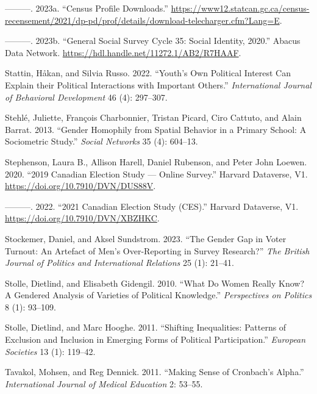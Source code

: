 \documentclass[
  letterpaper,
  DIV=11,
  numbers=noendperiod]{scrreprt}
\newlength{\cslhangindent}
\newenvironment{CSLReferences}[2] %
 {\begin{list}{}{%
  \setlength{\itemindent}{0pt}
  \setlength{\leftmargin}{0pt}
  \setlength{\parsep}{0pt}
  \ifodd #1
   \setlength{\leftmargin}{\cslhangindent}
   \setlength{\itemindent}{-1\cslhangindent}
  \fi
  \setlength{\itemsep}{#2\baselineskip}}}
 {\end{list}}
\begin{document}
\begin{CSLReferences}{1}{0}
---------. 2023a. {``{Census Profile Downloads}.''}
\url{https://www12.statcan.gc.ca/census-recensement/2021/dp-pd/prof/details/download-telecharger.cfm?Lang=E}.

---------. 2023b. {``{General Social Survey Cycle 35: Social Identity,
2020}.''} Abacus Data Network.
\url{https://hdl.handle.net/11272.1/AB2/R7HAAF}.

Stattin, Håkan, and Silvia Russo. 2022. {``{Youth's Own Political
Interest Can Explain their Political Interactions with Important
Others}.''} \emph{International Journal of Behavioral Development} 46
(4): 297--307.

Stehlé, Juliette, François Charbonnier, Tristan Picard, Ciro Cattuto,
and Alain Barrat. 2013. {``{Gender Homophily from Spatial Behavior in a
Primary School: A Sociometric Study}.''} \emph{Social Networks} 35 (4):
604--13.

Stephenson, Laura B., Allison Harell, Daniel Rubenson, and Peter John
Loewen. 2020. {``{2019 Canadian Election Study --- Online Survey}.''}
Harvard Dataverse, V1. \url{https://doi.org/10.7910/DVN/DUS88V}.

---------. 2022. {``{2021 Canadian Election Study (CES)}.''} Harvard
Dataverse, V1. \url{https://doi.org/10.7910/DVN/XBZHKC}.

Stockemer, Daniel, and Aksel Sundstrom. 2023. {``{The Gender Gap in
Voter Turnout: An Artefact of Men's Over-Reporting in Survey
Research?}''} \emph{The British Journal of Politics and International
Relations} 25 (1): 21--41.

Stolle, Dietlind, and Elisabeth Gidengil. 2010. {``{What Do Women Really
Know? A Gendered Analysis of Varieties of Political Knowledge}.''}
\emph{Perspectives on Politics} 8 (1): 93--109.

Stolle, Dietlind, and Marc Hooghe. 2011. {``{Shifting Inequalities:
Patterns of Exclusion and Inclusion in Emerging Forms of Political
Participation}.''} \emph{European Societies} 13 (1): 119--42.

Tavakol, Mohsen, and Reg Dennick. 2011. {``{Making Sense of Cronbach's
Alpha}.''} \emph{International Journal of Medical Education} 2: 53--55.


\end{CSLReferences}
\end{document}
